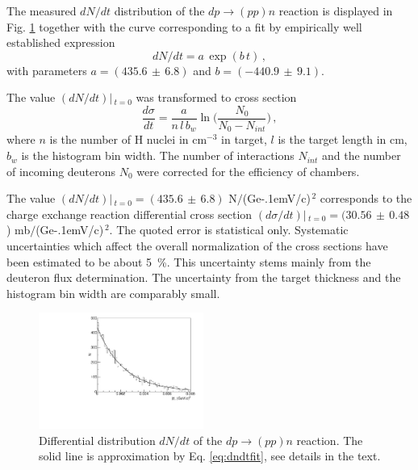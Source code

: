 \documentclass[twocolumn,epjc3]{svjour3}
\newcommand{\dpchex} {\ensuremath{dp \rightarrow (pp)n}\xspace}
\newcommand{\GeVc}   {Ge\kern-.1emV/c\xspace}
\begin{document}
The measured $dN/dt$ distribution of the \dpchex reaction is
displayed in Fig. \ref{fig:dndt} together with the curve corresponding to a fit
by empirically well established expression
\begin{equation}
  \label{eq:dndtfit}
  dN/dt = a\,\exp(b\,t)\,,
\end{equation}
with parameters $a=(435.6\,\pm\,6.8)$ and $b=(-440.9\,\pm\,9.1)$.

The value $(dN/dt)|\,_{t=0}$ was transformed to cross section
\begin{equation}
  \frac{d\sigma}{dt} =
  \frac{a}{n\,l\,b_w}\ln\bigg(\frac{N_0}{N_0-N_{int}}\bigg)\,,
\end{equation}
where $n$ is the number of H nuclei in cm$^{-3}$ in target, $l$ is the target
length in cm, $b_w$ is the histogram bin width. The number of interactions
$N_{int}$ and the number of incoming deuterons $N_0$ were corrected for the
efficiency of chambers.

The value $(dN/dt)|\,_{t=0}=(435.6\,\pm\,6.8)$ N$/$(\GeVc)$^{\,2}$ corresponds
to the charge exchange reaction differential cross section
$(d\sigma/dt)|\,_{t=0}=(30.56\,\pm\,0.48$) mb$/$(\GeVc)$^{\,2}$.
The quoted error is statistical only. Systematic uncertainties which
affect the overall normalization of the cross sections have been estimated to be
about 5~\%. This uncertainty stems mainly from the deuteron flux determination.
The uncertainty from the target thickness and the histogram bin width are
comparably small.

\begin{figure}[h]
  \centering
  \includegraphics[width=0.48\textwidth]{dp_dN.pdf}
  \caption{Differential distribution $dN/dt$ of the \dpchex reaction. The solid
    line is approximation by Eq. \eqref{eq:dndtfit}, see details in the text.}
  \label{fig:dndt}
\end{figure}
\end{document}
